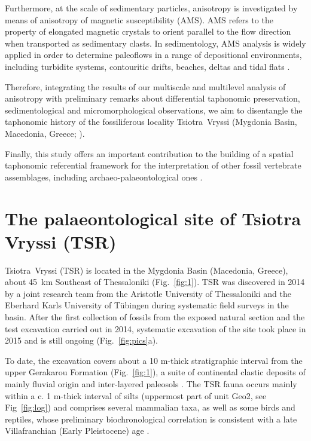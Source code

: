 \documentclass[review,times,authoryear]{elsarticle} %
\begin{document}
Furthermore, at the scale of sedimentary particles, anisotropy is investigated by means of anisotropy of magnetic susceptibility (AMS). AMS refers to the property of elongated magnetic crystals to orient parallel to the flow direction when transported as sedimentary clasts. In sedimentology, AMS analysis is widely applied in order to determine paleoflows in a range of depositional environments, including turbidite systems, contouritic drifts, beaches, deltas and tidal flats \citep[][among others]{Lowrie1987,Liu2001,Pares2007,Novak2014,Felletti2016}.

Therefore, integrating the results of our multiscale and multilevel analysis of anisotropy with preliminary remarks about differential taphonomic preservation, sedimentological and micromorphological observations, we aim to disentangle the taphonomic history of the fossiliferous locality Tsiotra~Vryssi (Mygdonia Basin, Macedonia, Greece; \citealp{Konidaris2015}).

Finally, this study offers an important contribution to the building of a spatial taphonomic referential framework for the interpretation of other fossil vertebrate assemblages, including archaeo-palaeontological ones \citep{Dominguez-Rodrigo2017}.

\section{The palaeontological site of Tsiotra Vryssi (TSR)}

Tsiotra~Vryssi (TSR) is located in the Mygdonia Basin (Macedonia, Greece), about 45~km Southeast of Thessaloniki (Fig.~\ref{fig:1}). TSR was discovered in 2014 by a joint research team from the Aristotle University of Thessaloniki and the Eberhard Karls University of Tübingen during systematic field surveys in the basin. After the first collection of fossils from the exposed natural section and the test excavation carried out in 2014, systematic excavation of the site took place in 2015 and is still ongoing (Fig.~\ref{fig:pics}a).

To date, the excavation covers about a 10 m-thick stratigraphic interval from the upper Gerakarou Formation (Fig.~\ref{fig:1}), a suite of continental clastic deposits of mainly fluvial origin and inter-layered paleosols \citep{Koufos1995,Konidaris2015}. The TSR fauna occurs mainly within a c. 1 m-thick interval of silts (uppermost part of unit Geo2, see Fig~\ref{fig:log}) and comprises several mammalian taxa, as well as some birds and reptiles, whose preliminary biochronological correlation is consistent with a late Villafranchian (Early Pleistocene) age \citep{Konidaris2015,Konidaris2016}.
\end{document}
